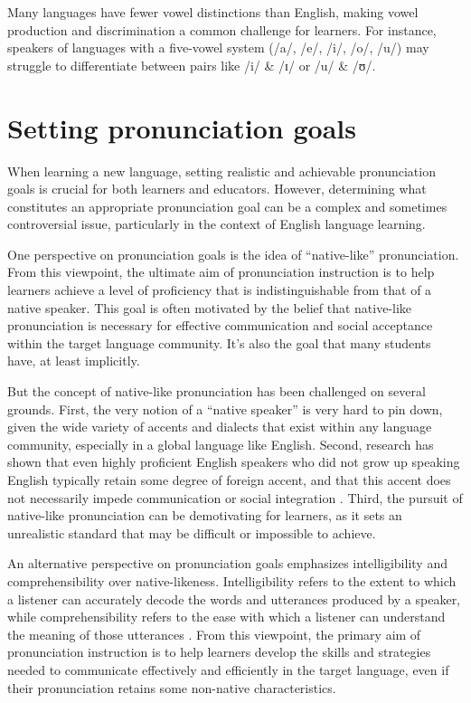 Many languages have fewer vowel distinctions than English, making vowel production and discrimination a common challenge for learners. For instance, speakers of languages with a five-vowel system (/a/, /e/, /i/, /o/, /u/) may struggle to differentiate between pairs like /i/ \& /ɪ/ or /u/ \& /ʊ/.






\section{Setting pronunciation goals}

When learning a new language, setting realistic and achievable pronunciation goals is crucial for both learners and educators. However, determining what constitutes an appropriate pronunciation goal can be a complex and sometimes controversial issue, particularly in the context of English language learning.

One perspective on pronunciation goals is the idea of ``native-like'' pronunciation. From this viewpoint, the ultimate aim of pronunciation instruction is to help learners achieve a level of proficiency that is indistinguishable from that of a native speaker. This goal is often motivated by the belief that native-like pronunciation is necessary for effective communication and social acceptance within the target language community. It's also the goal that many students have, at least implicitly.

But the concept of native-like pronunciation has been challenged on several grounds. First, the very notion of a ``native speaker'' is very hard to pin down, given the wide variety of accents and dialects that exist within any language community, especially in a global language like English. Second, research has shown that even highly proficient English speakers who did not grow up speaking English typically retain some degree of foreign accent, and that this accent does not necessarily impede communication or social integration \citep{DerwingMunro2009}. Third, the pursuit of native-like pronunciation can be demotivating for learners, as it sets an unrealistic standard that may be difficult or impossible to achieve.

An alternative perspective on pronunciation goals emphasizes intelligibility and comprehensibility over native-likeness. Intelligibility refers to the extent to which a listener can accurately decode the words and utterances produced by a speaker, while comprehensibility refers to the ease with which a listener can understand the meaning of those utterances \citep{DerwingMunro2015}. From this viewpoint, the primary aim of pronunciation instruction is to help learners develop the skills and strategies needed to communicate effectively and efficiently in the target language, even if their pronunciation retains some non-native characteristics.

